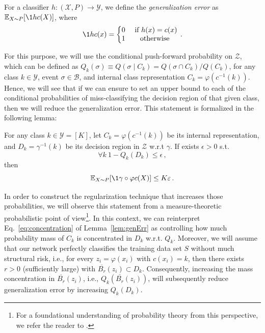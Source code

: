 \documentclass[../main.tex]{subfiles}
\begin{document}
\begin{definition}
For a classifier $h: (\mathcal{X}, P) \to \mathcal{Y}$, we define the \emph{generalization error} as $\E_{X \sim P}[\1{h}{c}(X)]$, where 
\[
\1{h}{c}(x) = \left\{\begin{matrix}
0 & \text{ if } h(x)=c(x)\\
1 &  \text{ otherwise }\\
\end{matrix}\right.\,.
\]
\end{definition}

For this purpose, we will use the conditional push-forward probability on $\mathcal{Z}$, which can be defined as $Q_k(\sigma)\equiv Q(\sigma \mid C_k) = Q(\sigma \cap C_k)/Q(C_k)$, for any class $k\in \mathcal{Y}$, event $\sigma \in \mathcal{B}$, and internal class representation $C_k=\varphi(c^{-1}(k))$. Hence, we will see that if we can ensure to set an upper bound to each of the conditional probabilities of miss-classifying the decision region of that given class, then we will reduce the generalization error. This statement is formalized in the following lemma:

\begin{lemma}
\label{lem:genErr}
For any class $k\in \mathcal{Y} = [K]$, let $C_k=\varphi(c^{-1}(k))$ be its internal representation, and $D_k= \gamma^{-1}(k)$ be its decision region in $\mathcal{Z}$ w.r.t $\gamma$. If exists $\epsilon >0$ s.t.
\begin{equation}
\label{eq:concentration}
 \forall k\ 1-Q_k(D_k) \leq \epsilon\,,   
\end{equation}
then 
\[
\E_{X \sim P}[\1{\gamma \circ \varphi}{c}(X)] \leq K\epsilon\,. 
\]
\end{lemma}

In order to construct the regularization technique that increases those probabilities, we will observe this statement from a measure-theoretic probabilistic point of view\footnote{For a foundational understanding of probability theory from this perspective, we refer the reader to \cite[Appendix ~ B]{schervish_theory_1995}.}. In this context, we can reinterpret Eq.~\ref{eq:concentration} of Lemma~\ref{lem:genErr} as controlling how much probability mass of $C_k$ is concentrated in $D_k$ w.r.t. $Q_k$. Moreover, we will assume that our network perfectly classifies the training data set $S$ without much structural risk, i.e., for every $z_i=\varphi(x_i)$ with $c(x_i)=k$, then there exists $r>0$ (sufficiently large) with $\overline{B_r}(z_i)\subset D_k$.  Consequently, increasing the mass concentration in $\overline{B_r}(z_i)$, i.e., $Q_k(\overline{B_r}(z_i))$, will subsequently reduce generalization error by increasing $Q_k(D_k)$.\\
\end{document}
